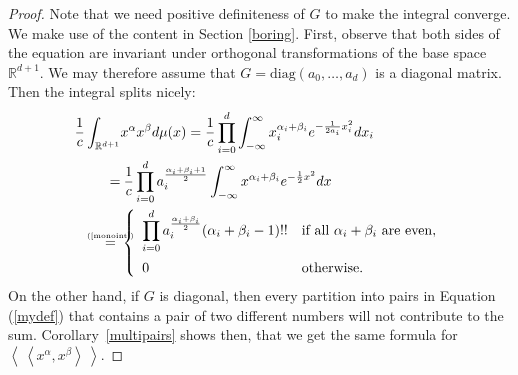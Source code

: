\documentclass{amsart}
\newcommand{\bra}{\left<\!\!\!\:\left<}
\newcommand{\ket}{\right>\!\!\!\:\right>}
\newcommand{\myeq}[1]{\mathrel{\overset{\makebox[0pt]{\text{\tiny #1}}}{=}}}
\newcommand{\R}{\mathbb{R}}
\theoremstyle{plain}
\theoremstyle{definition}
\theoremstyle{remark}
\begin{document}
\begin{proof} Note that we need positive definiteness of $G$ to make the integral converge. We make use of the content in Section \ref{boring}.
First, observe that both sides of the equation are invariant under orthogonal transformations of the base space $\R^{d+1}$. We may therefore assume that $G= \text{diag}\left(a_0,\ldots,a_d\right)$ is a diagonal matrix. Then the integral splits nicely:
\begin{align*}
\frac{1}{c}\int_{\R^{d+1}}& x^\alpha x^\beta d\mu(x)= \frac{1}{c}\prod_{i=0}^d \int_{-\infty}^\infty x_i^{\alpha_i+\beta_i} e^{-\frac{1}{2a_i}x_i^2}dx_i \\=&\: 
\frac{1}{c}\prod_{i=0}^d a_i^{\frac{\alpha_i+\beta_i+1}{2}}\int_{-\infty}^\infty x^{\alpha_i+\beta_i} e^{-\frac{1}{2}x^2}dx\\
\myeq{(\ref{monoint})}\  &\left\{
\begin{array}{*2{l}p{5cm}}\displaystyle \prod_{i=0}^d a_i^{\frac{\alpha_i+\beta_i}{2}}(\alpha_i+\beta_i-1)!! &\text{if all }\alpha_i+\beta_i\text{ are even}, \vspace{0.2cm} \\ 
 0 &\text{otherwise}.
\end{array}
 \right.
\end{align*}
On the other hand, if $G$ is diagonal, then every partition into pairs in Equation (\ref{mydef}) that contains a pair of two different numbers will not contribute to the sum. Corollary~\ref{multipairs} shows then, that we get the same formula for $\bra x^\alpha ,x^\beta\ket$.
\end{proof}
\end{document}
